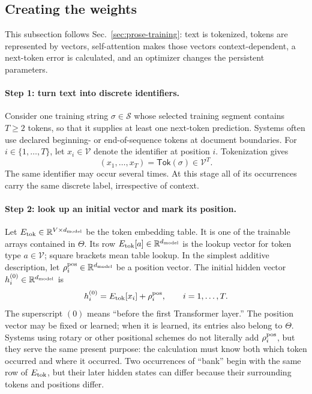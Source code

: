 \documentclass[
  aps,
  reprint,
  superscriptaddress,
  floatfix,
  nofootinbib,
  longbibliography
]{revtex4-2}
\newcommand{\R}{\mathbb{R}}
\begin{document}
\subsection{Creating the weights}
\label{app:training}

This subsection follows Sec.~\ref{sec:prose-training}: text is tokenized,
tokens are represented by vectors, self-attention makes those vectors
context-dependent, a next-token error is calculated, and an optimizer changes
the persistent parameters.

\paragraph{Step 1: turn text into discrete identifiers.}
Consider one training string $\sigma\in\mathcal S$ whose selected training
segment contains $T\geq2$ tokens, so that it supplies at least one next-token
prediction.  Systems often use declared beginning- or end-of-sequence tokens
at document boundaries.  For $i\in\{1,\ldots,T\}$, let
$x_i\in\mathcal V$ denote the identifier at position $i$.  Tokenization gives
\begin{equation}
\label{eq:app-forward-map}
(x_1,\ldots,x_T)=\mathsf{Tok}(\sigma)
\in\mathcal V^T.
\end{equation}
The same identifier may occur several times.  At this stage all
of its occurrences carry the same discrete label, irrespective of context.

\paragraph{Step 2: look up an initial vector and mark its position.}
Let $E_{\rm tok}\in\R^{V\times d_{\rm model}}$ be the token embedding table.  It is one of
the trainable arrays contained in $\Theta$.  Its row
$E_{\rm tok}[a]\in\R^{d_{\rm model}}$ is the lookup vector for token type
$a\in\mathcal V$; square brackets mean table lookup.  In the simplest additive
description, let $\rho_i^{\rm pos}\in\R^{d_{\rm model}}$ be a position vector.
The initial hidden vector $h_i^{(0)}\in\R^{d_{\rm model}}$ is
\begin{equation}
\label{eq:app-initial-state}
h_i^{(0)}=E_{\rm tok}[x_i]+\rho_i^{\rm pos},
\qquad i=1,\ldots,T.
\end{equation}
The superscript $(0)$ means ``before the first Transformer layer.''  The
position vector may be fixed or learned; when it is learned, its entries also
belong to $\Theta$.  Systems using rotary or other positional schemes do not literally add
$\rho_i^{\rm pos}$, but they
serve the same present purpose: the calculation must know both which token
occurred and where it occurred.  Two occurrences of ``bank'' begin with the
same row of $E_{\rm tok}$, but their later hidden states can differ because
their surrounding tokens and positions differ.
\end{document}
